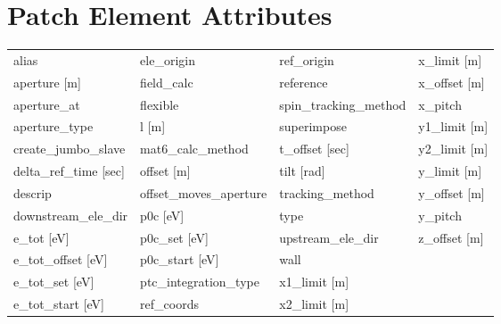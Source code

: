  \section{Patch Element Attributes}
 \label{s:list.patch}
 
 \begin{tabular}{llll} \toprule
alias                            & ele_origin                       & ref_origin                       & x_limit [m]                      \\
aperture [m]                     & field_calc                       & reference                        & x_offset [m]                     \\
aperture_at                      & flexible                         & spin_tracking_method             & x_pitch                          \\
aperture_type                    & l [m]                            & superimpose                      & y1_limit [m]                     \\
create_jumbo_slave               & mat6_calc_method                 & t_offset [sec]                   & y2_limit [m]                     \\
delta_ref_time [sec]             & offset [m]                       & tilt [rad]                       & y_limit [m]                      \\
descrip                          & offset_moves_aperture            & tracking_method                  & y_offset [m]                     \\
downstream_ele_dir               & p0c [eV]                         & type                             & y_pitch                          \\
e_tot [eV]                       & p0c_set [eV]                     & upstream_ele_dir                 & z_offset [m]                     \\
e_tot_offset [eV]                & p0c_start [eV]                   & wall                             &                                  \\
e_tot_set [eV]                   & ptc_integration_type             & x1_limit [m]                     &                                  \\
e_tot_start [eV]                 & ref_coords                       & x2_limit [m]                     &                                  \\
 \bottomrule
 \end{tabular}
 \vfill
 

